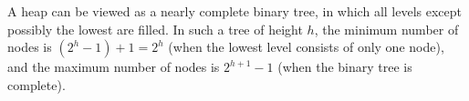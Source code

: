 A heap can be viewed as a nearly complete binary tree, in which all levels except possibly the lowest are filled.
In such a tree of height $h$, the minimum number of nodes is $(2^h-1)+1=2^h$ (when the lowest level consists of only one node), and the maximum number of nodes is $2^{h+1}-1$ (when the binary tree is complete).
